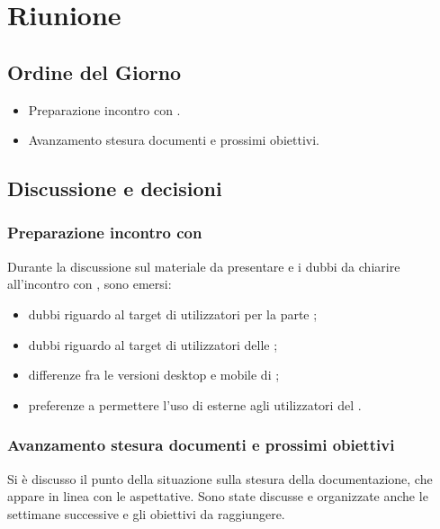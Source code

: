 \section{Riunione}
\subsection{Ordine del Giorno}
\begin{itemize}
	\item Preparazione incontro con \Proponente{}.
	\item Avanzamento stesura documenti e prossimi obiettivi.
\end{itemize}

\subsection{Discussione e decisioni}
\subsubsection{Preparazione incontro con \Proponente}
Durante la discussione sul materiale da presentare e i dubbi da chiarire all'incontro con \Proponente{}, sono emersi:
\begin{itemize}
	\item dubbi riguardo al target di utilizzatori per la parte ;
	\item dubbi riguardo al target di utilizzatori delle ;
	\item differenze fra le versioni desktop e mobile di ;
	\item preferenze a permettere l'uso di  esterne agli utilizzatori del .
\end{itemize}

\subsubsection{Avanzamento stesura documenti e prossimi obiettivi}
Si è discusso il punto della situazione sulla stesura della documentazione, che appare in linea con le aspettative.
Sono state discusse e organizzate anche le settimane successive e gli obiettivi da raggiungere.


\clearpage
